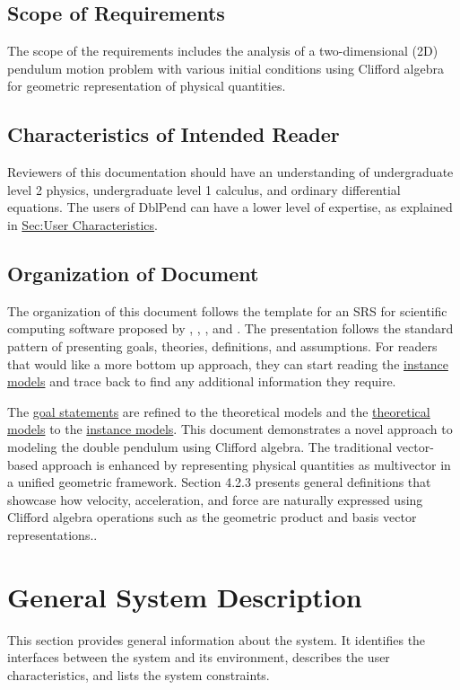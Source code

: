 \documentclass[12pt]{article}
\begin{document}
{\subsection{Scope of Requirements}
\label{Sec:ReqsScope}
The scope of the requirements includes the analysis of a two-dimensional (2D) pendulum motion problem with various initial conditions using Clifford algebra for geometric representation of physical quantities.

\subsection{Characteristics of Intended Reader}
\label{Sec:ReaderChars}
Reviewers of this documentation should have an understanding of undergraduate level 2 physics, undergraduate level 1 calculus, and ordinary differential equations. The users of DblPend can have a lower level of expertise, as explained in \hyperref[Sec:UserChars]{Sec:User Characteristics}.

\subsection{Organization of Document}
\label{Sec:DocOrg}
The organization of this document follows the template for an SRS for scientific computing software proposed by \cite{koothoor2013}, \cite{smithLai2005}, \cite{smithEtAl2007}, and \cite{smithKoothoor2016}. The presentation follows the standard pattern of presenting goals, theories, definitions, and assumptions. For readers that would like a more bottom up approach, they can start reading the \hyperref[Sec:IMs]{instance models} and trace back to find any additional information they require.

The \hyperref[Sec:GoalStmt]{goal statements} are refined to the theoretical models and the \hyperref[Sec:TMs]{theoretical models} to the \hyperref[Sec:IMs]{instance models}. This document demonstrates a novel approach to modeling the double pendulum using Clifford algebra. The traditional vector-based approach is enhanced by representing physical quantities as multivector in a unified geometric framework. Section 4.2.3 presents general definitions that showcase how velocity, acceleration, and force are naturally expressed using Clifford algebra operations such as the geometric product and basis vector representations..

\section{General System Description}
\label{Sec:GenSysDesc}
This section provides general information about the system. It identifies the interfaces between the system and its environment, describes the user characteristics, and lists the system constraints.

}
\end{document}
